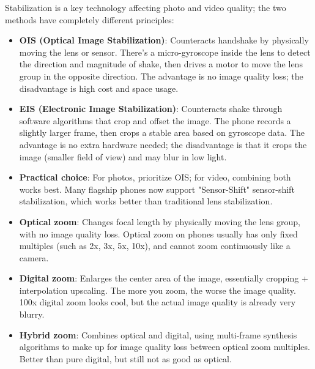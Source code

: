 
Stabilization is a key technology affecting photo and video quality; the two methods have completely different principles:

\begin{itemize}
  \item \textbf{OIS (Optical Image Stabilization)}: Counteracts handshake by physically moving the lens or sensor. There's a micro-gyroscope inside the lens to detect the direction and magnitude of shake, then drives a motor to move the lens group in the opposite direction. The advantage is no image quality loss; the disadvantage is high cost and space usage.
  \item \textbf{EIS (Electronic Image Stabilization)}: Counteracts shake through software algorithms that crop and offset the image. The phone records a slightly larger frame, then crops a stable area based on gyroscope data. The advantage is no extra hardware needed; the disadvantage is that it crops the image (smaller field of view) and may blur in low light.
  \item \textbf{Practical choice}: For photos, prioritize OIS; for video, combining both works best. Many flagship phones now support "Sensor-Shift" sensor-shift stabilization, which works better than traditional lens stabilization.
\end{itemize}


\begin{itemize}
  \item \textbf{Optical zoom}: Changes focal length by physically moving the lens group, with no image quality loss. Optical zoom on phones usually has only fixed multiples (such as 2x, 3x, 5x, 10x), and cannot zoom continuously like a camera.
  \item \textbf{Digital zoom}: Enlarges the center area of the image, essentially cropping + interpolation upscaling. The more you zoom, the worse the image quality. 100x digital zoom looks cool, but the actual image quality is already very blurry.
  \item \textbf{Hybrid zoom}: Combines optical and digital, using multi-frame synthesis algorithms to make up for image quality loss between optical zoom multiples. Better than pure digital, but still not as good as optical.
\end{itemize}


